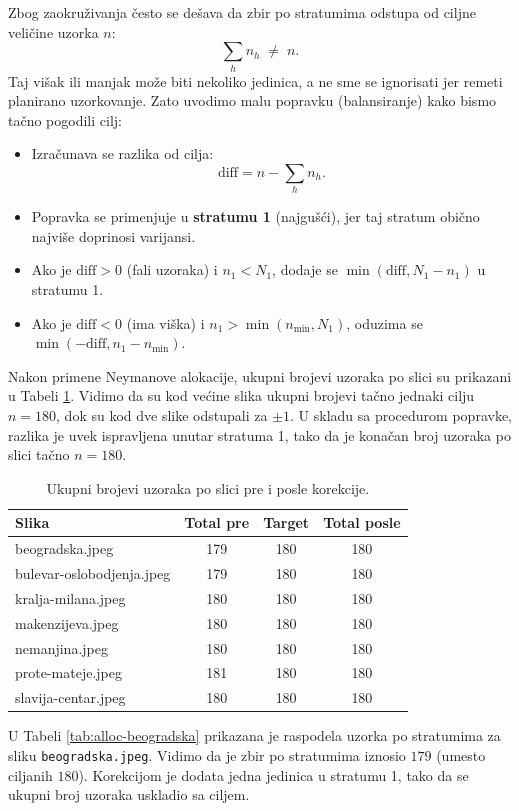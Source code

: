 \documentclass[a4paper,12pt]{article}
\begin{document}
Zbog zaokruživanja često se dešava da zbir po stratumima odstupa od ciljne veličine uzorka $n$:
\[
\sum_h n_h \;\neq\; n.
\]
Taj višak ili manjak može biti nekoliko jedinica, a ne sme se ignorisati jer remeti planirano uzorkovanje.
Zato uvodimo malu popravku (balansiranje) kako bismo tačno pogodili cilj:
\begin{itemize}
  \item Izračunava se razlika od cilja:
  \[
  \text{diff} = n - \sum_h n_h.
  \]
  \item Popravka se primenjuje u \textbf{stratumu 1} (najgušći), jer taj stratum obično najviše doprinosi varijansi. 
  \item Ako je $\text{diff} > 0$ (fali uzoraka) i $n_1 < N_1$, dodaje se $\min(\text{diff}, N_1 - n_1)$ u stratumu 1.
  \item Ako je $\text{diff} < 0$ (ima viška) i $n_1 > \min(n_{\min}, N_1)$, oduzima se $\min(-\text{diff}, n_1 - n_{\min})$.
\end{itemize}

\noindent
Nakon primene Neymanove alokacije, ukupni brojevi uzoraka po slici su prikazani u Tabeli \ref{tab:alloc-fix-real}.  
Vidimo da su kod većine slika ukupni brojevi tačno jednaki cilju $n=180$, dok su kod dve slike odstupali za $\pm 1$.  
U skladu sa procedurom popravke, razlika je uvek ispravljena unutar stratuma 1, tako da je konačan broj uzoraka po slici tačno $n=180$.

\begin{table}[H]
\centering
\begin{tabular}{lccc}
\hline
Slika & Total pre & Target & Total posle \\
\hline
beogradska.jpeg          & 179 & 180 & 180 \\
bulevar-oslobodjenja.jpeg & 179 & 180 & 180 \\
kralja-milana.jpeg       & 180 & 180 & 180 \\
makenzijeva.jpeg         & 180 & 180 & 180 \\
nemanjina.jpeg           & 180 & 180 & 180 \\
prote-mateje.jpeg        & 181 & 180 & 180 \\
slavija-centar.jpeg      & 180 & 180 & 180 \\
\hline
\end{tabular}
\caption{Ukupni brojevi uzoraka po slici pre i posle korekcije.}
\label{tab:alloc-fix-real}
\end{table}

\noindent
U Tabeli \ref{tab:alloc-beogradska} prikazana je raspodela uzorka po stratumima za sliku \texttt{beogradska.jpeg}.  
Vidimo da je zbir po stratumima iznosio $179$ (umesto ciljanih $180$).  
Korekcijom je dodata jedna jedinica u stratumu 1, tako da se ukupni broj uzoraka uskladio sa ciljem.
\end{document}
